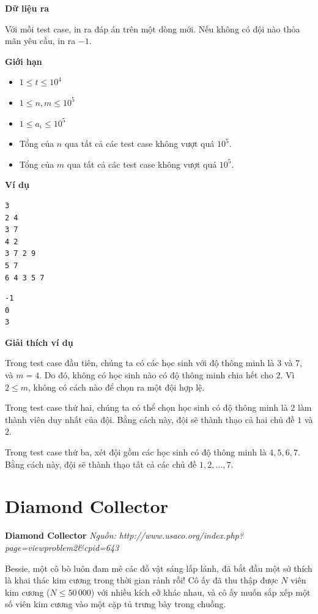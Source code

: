 \documentclass[12pt,a4paper]{article}
\newcommand{\problem}[2]{%
  \begin{mdframed}[
    linecolor=framecolor,
    linewidth=1.5pt,
    backgroundcolor=white,
    topline=true, bottomline=true,
    leftline=true, rightline=true,
    innerleftmargin=10pt, innerrightmargin=10pt,
    innertopmargin=6pt, innerbottommargin=6pt,
  ]
  \textbf{\large #1} \hfill \textit{Nguồn: #2}
  \end{mdframed}
  \vspace{4pt}%
}
\newcommand{\outputformat}{%
  \vspace{6pt}\textbf{\textcolor{sectioncolor}{Dữ liệu ra}}\par\vspace{2pt}%
}
\newcommand{\constraints}{%
  \vspace{6pt}\textbf{\textcolor{sectioncolor}{Giới hạn}}\par\vspace{2pt}%
}
\newcommand{\example}{%
  \vspace{6pt}\textbf{\textcolor{sectioncolor}{Ví dụ}}\par\vspace{2pt}%
}
\newcommand{\explanation}{%
  \vspace{6pt}\textbf{\textcolor{sectioncolor}{Giải thích ví dụ}}\par\vspace{2pt}%
}
\begin{document}
\outputformat
\begin{outputbox}
Với mỗi test case, in ra đáp án trên một dòng mới. Nếu không có đội nào thỏa mãn yêu cầu, in ra $-1$.
\end{outputbox}

\constraints
\begin{constraintbox}
\begin{itemize}
    \item $1 \le t \le 10^4$
    \item $1 \le n, m \le 10^5$
    \item $1 \le a_i \le 10^5$
    \item Tổng của $n$ qua tất cả các test case không vượt quá $10^5$.
    \item Tổng của $m$ qua tất cả các test case không vượt quá $10^5$.
\end{itemize}
\end{constraintbox}

\example
\begin{lstlisting}
3
2 4
3 7
4 2
3 7 2 9
5 7
6 4 3 5 7
\end{lstlisting}
\begin{lstlisting}
-1
0
3
\end{lstlisting}

\explanation
Trong test case đầu tiên, chúng ta có các học sinh với độ thông minh là $3$ và $7$, và $m = 4$. Do đó, không có học sinh nào có độ thông minh chia hết cho $2$. Vì $2 \le m$, không có cách nào để chọn ra một đội hợp lệ.

Trong test case thứ hai, chúng ta có thể chọn học sinh có độ thông minh là $2$ làm thành viên duy nhất của đội. Bằng cách này, đội sẽ thành thạo cả hai chủ đề $1$ và $2$.

Trong test case thứ ba, xét đội gồm các học sinh có độ thông minh là $4, 5, 6, 7$. Bằng cách này, đội sẽ thành thạo tất cả các chủ đề $1, 2, \ldots, 7$.


\section{Diamond Collector}
\problem{Diamond Collector}{http://www.usaco.org/index.php?page=viewproblem2\&cpid=643}

Bessie, một cô bò luôn đam mê các đồ vật sáng lấp lánh, đã bắt đầu một sở thích là khai thác kim cương trong thời gian rảnh rỗi! Cô ấy đã thu thập được $N$ viên kim cương ($N \le 50\,000$) với nhiều kích cỡ khác nhau, và cô ấy muốn sắp xếp một số viên kim cương vào một cặp tủ trưng bày trong chuồng.
\end{document}
